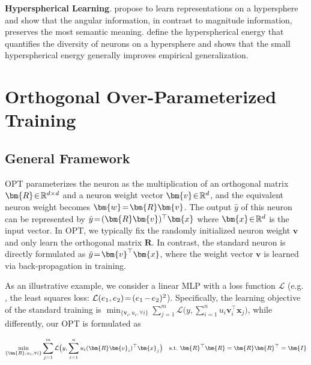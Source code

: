 \par

\textbf{Hyperspherical Learning}. \cite{liu2017deep,Liu2017CVPR,wang2018cosface,deng2019arcface,wang2018additive,LinCoMHE20,Liu2021SphereUni} propose to learn representations on a hypersphere and show that the angular information, in contrast to magnitude information, preserves the most semantic meaning. \cite{liu2018learning} define the hyperspherical energy that quantifies the diversity of neurons on a hypersphere and shows that the small hyperspherical energy generally improves empirical generalization.

\section{Orthogonal Over-Parameterized Training}

\subsection{General Framework}

OPT parameterizes the neuron as the multiplication of an orthogonal matrix $\thickmuskip=2mu \medmuskip=2mu \bm{R}\in\mathbb{R}^{d\times d}$ and a neuron weight vector $\thickmuskip=2mu \medmuskip=2mu \bm{v}\in\mathbb{R}^d$, and the equivalent neuron weight becomes $\thickmuskip=2mu \medmuskip=2mu \bm{w} =\bm{R}\bm{v}$. The output $\hat{y}$ of this neuron can be represented by $\thickmuskip=2mu \medmuskip=2mu \hat{y} = (\bm{R}\bm{v})^\top\bm{x}$ where $\thickmuskip=2mu \medmuskip=2mu \bm{x}\in\mathbb{R}^d$ is the input vector. In OPT, we typically fix the randomly initialized neuron weight $\bm{v}$ and only learn the orthogonal matrix $\bm{R}$. In contrast, the standard neuron is directly formulated as $\thickmuskip=2mu \medmuskip=2mu \hat{y}=\bm{v}^\top\bm{x}$, where the weight vector $\bm{v}$ is learned via back-propagation in training.

As an illustrative example, we consider a linear MLP with a loss function $\mathcal{L}$ (e.g. , the least squares loss: $\thickmuskip=2mu \medmuskip=2mu \mathcal{L}(e_1,e_2)=(e_1-e_2)^2$). Specifically, the learning objective of the standard training is $\min_{\{\bm{v}_i,u_i,\forall i\}} \sum_{j=1}^{m}\mathcal{L}\big(y,\sum_{i=1}^{n} u_i\bm{v}_i^\top\bm{x}_j\big)$, while differently, our OPT is formulated as

\begin{equation}\label{opt}
\footnotesize
\begin{aligned}
    \min_{\{\bm{R},u_i,\forall i\}} \sum_{j=1}^{m}\mathcal{L}\big(y,\sum_{i=1}^{n} u_i(\bm{R}\bm{v}_i)^\top\bm{x}_j\big)\ \ \ \textnormal{s.t.}\ \bm{R}^\top\bm{R}=\bm{R}\bm{R}^\top=\bm{I}
\end{aligned}
\end{equation}

